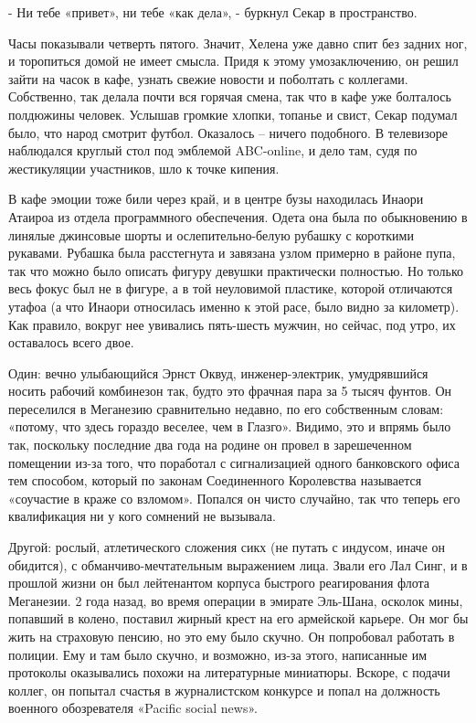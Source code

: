 \documentclass[10pt,final]{book}
\begin{document}
- Ни тебе «привет», ни тебе «как дела», - буркнул Секар в пространство.

Часы показывали четверть пятого. Значит, Хелена уже давно спит без задних ног, и торопиться домой не имеет смысла. Придя к этому умозаключению, он решил зайти на часок в кафе, узнать свежие новости и поболтать с коллегами. Собственно, так делала почти вся горячая смена, так что в кафе уже болталось полдюжины человек. Услышав громкие хлопки, топанье и свист, Секар подумал было, что народ смотрит футбол. Оказалось -- ничего подобного. В телевизоре наблюдался круглый стол под эмблемой ABC-online, и дело там, судя по жестикуляции участников, шло к точке кипения.

В кафе эмоции тоже били через край, и в центре бузы находилась Инаори Атаироа из отдела программного обеспечения. Одета она была по обыкновению в линялые джинсовые шорты и ослепительно-белую рубашку с короткими рукавами. Рубашка была расстегнута и завязана узлом примерно в районе пупа, так что можно было описать фигуру девушки практически полностью. Но только весь фокус был не в фигуре, а в той неуловимой пластике, которой отличаются утафоа (а что Инаори относилась именно к этой расе, было видно за километр). Как правило, вокруг нее увивались пять-шесть мужчин, но сейчас, под утро, их оставалось всего двое.

Один: вечно улыбающийся Эрнст Оквуд, инженер-электрик, умудрявшийся носить рабочий комбинезон так, будто это фрачная пара за 5 тысяч фунтов. Он переселился в Меганезию сравнительно недавно, по его собственным словам: «потому, что здесь гораздо веселее, чем в Глазго». Видимо, это и впрямь было так, поскольку последние два года на родине он провел в зарешеченном помещении из-за того, что поработал с сигнализацией одного банковского офиса тем способом, который по законам Соединенного Королевства называется «соучастие в краже со взломом». Попался он чисто случайно, так что теперь его квалификация ни у кого сомнений не вызывала.

Другой: рослый, атлетического сложения сикх (не путать с индусом, иначе он обидится), с обманчиво-мечтательным выражением лица. Звали его Лал Синг, и в прошлой жизни он был лейтенантом корпуса быстрого реагирования флота Меганезии. 2 года назад, во время операции в эмирате Эль-Шана, осколок мины, попавший в колено, поставил жирный крест на его армейской карьере. Он мог бы жить на страховую пенсию, но это ему было скучно. Он попробовал работать в полиции. Ему и там было скучно, и возможно, из-за этого, написанные им протоколы оказывались похожи на литературные миниатюры. Вскоре, с подачи коллег, он попытал счастья в журналистском конкурсе и попал на должность военного обозревателя «Pacific social news».
\end{document}
